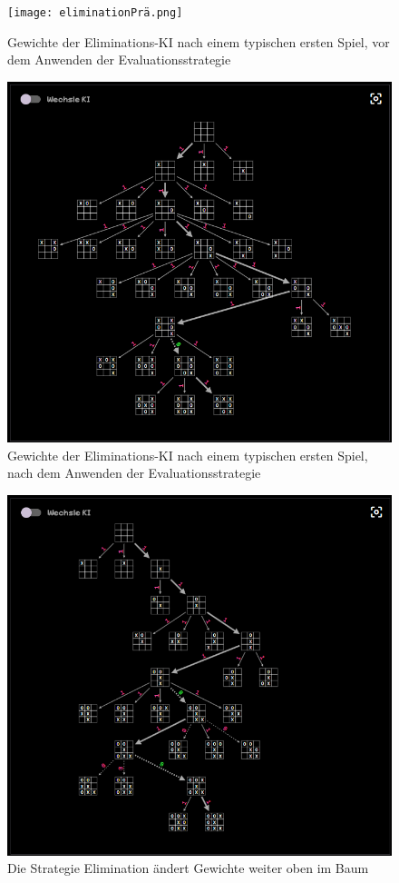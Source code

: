 \documentclass[titlepage]{scrartcl}
\begin{document}
\begin{figure}[htb]
\texttt{[image: eliminationPrä.png]}
\caption{Gewichte der Eliminations-KI nach einem typischen ersten Spiel, vor dem Anwenden der Evaluationsstrategie}
\label{eliminationPrä}
\end{figure}
\begin{figure}[htb]
\includegraphics[width = \linewidth]{eliminationPost.png}
\caption{Gewichte der Eliminations-KI nach einem typischen ersten Spiel, nach dem Anwenden der Evaluationsstrategie}
\label{eliminationPost}
\end{figure}

\begin{figure}[htb]
\includegraphics[width = \linewidth]{elimination1.png}
\caption{Die Strategie Elimination ändert Gewichte weiter oben im Baum}
\label{elimination1}
\end{figure}
\end{document}
